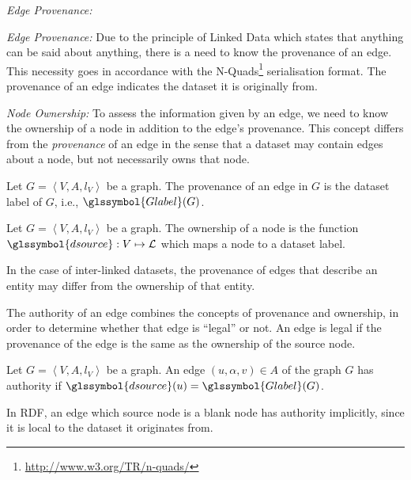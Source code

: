 \begin{labeling}{\emph{Edge Provenance:}}
	\item[\emph{Edge Provenance:}] Due to the principle of Linked Data which states that anything can be said about anything, there is a need to know the provenance of an edge. This necessity goes in accordance with the N-Quads\footnote{\url{http://www.w3.org/TR/n-quads/}} serialisation format. The provenance of an edge indicates the dataset it is originally from.

	\item[\emph{Node Ownership:}] To assess the information given by an edge, we need to know the ownership of a node in addition to the edge's provenance. This concept differs from the \emph{provenance} of an edge in the sense that a dataset may contain edges about a node, but not necessarily owns that node.
\end{labeling}

\begin{definition}
	Let $G = \left\langle V, A, l_V \right\rangle$ be a graph. The provenance of an edge in $G$ is the dataset label of $G$, i.e., $\glssymbol{Glabel}(G)$.
\end{definition}

\begin{definition}
	Let $G = \left\langle V, A, l_V \right\rangle$ be a graph. The ownership of a node is the function $\glssymbol{dsource} : V \mapsto \mathcal{L}$ which maps a node to a dataset label.
\end{definition}

\begin{remark}
	In the case of inter-linked datasets, the provenance of edges that describe an entity may differ from the ownership of that entity.
\end{remark}

The authority of an edge combines the concepts of provenance and ownership, in order to determine whether that edge is ``legal'' or not. An edge is legal if the provenance of the edge is the same as the ownership of the source node.

\begin{definition}
	Let $G = \left\langle V, A, l_V \right\rangle$ be a graph.
	An edge $(u, \alpha, v) \in A$ of the graph $G$ has authority if $\glssymbol{dsource}(u) = \glssymbol{Glabel}(G)$.
	\label{def:edge-authority}
\end{definition}

\begin{remark}
	In RDF, an edge which source node is a blank node has authority implicitly, since it is local to the dataset it originates from.
\end{remark}

